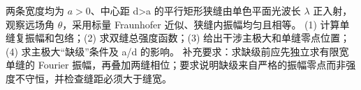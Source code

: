 两条宽度均为 \(a>0\)、中心距 d>a 的平行矩形狭缝由单色平面光波长 \(\lambda \) 正入射，观察远场角 \(\theta \)，采用标量 Fraunhofer 近似、狭缝内振幅均匀且相等。
(1) 计算单缝复振幅和包络；(2) 求双缝总强度函数；(3) 给出干涉主极大和单缝零点位置；(4) 求主极大“缺级”条件及 a/d 的影响。
补充要求：求缺级前应先独立求有限宽单缝的 Fourier 振幅，再叠加两缝相位；要求说明缺级来自严格的振幅零点而非强度不守恒，并检查缝距必须大于缝宽。
